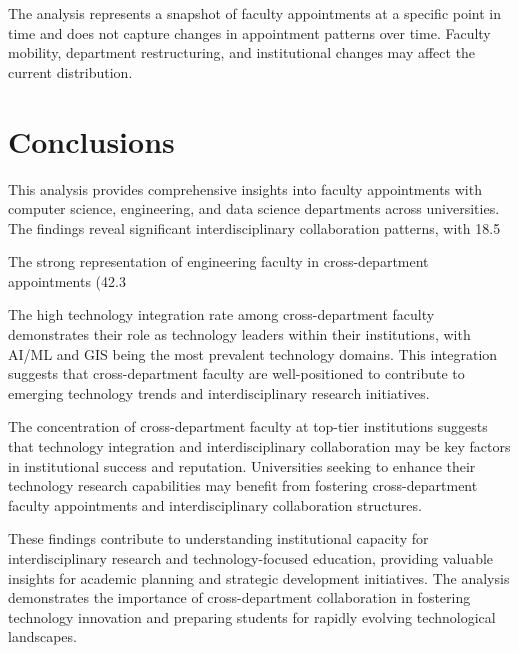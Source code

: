 \documentclass[12pt]{article}
\begin{document}
The analysis represents a snapshot of faculty appointments at a specific point in time and does not capture changes in appointment patterns over time. Faculty mobility, department restructuring, and institutional changes may affect the current distribution.

\section{Conclusions}

This analysis provides comprehensive insights into faculty appointments with computer science, engineering, and data science departments across universities. The findings reveal significant interdisciplinary collaboration patterns, with 18.5%

The strong representation of engineering faculty in cross-department appointments (42.3%

The high technology integration rate among cross-department faculty demonstrates their role as technology leaders within their institutions, with AI/ML and GIS being the most prevalent technology domains. This integration suggests that cross-department faculty are well-positioned to contribute to emerging technology trends and interdisciplinary research initiatives.

The concentration of cross-department faculty at top-tier institutions suggests that technology integration and interdisciplinary collaboration may be key factors in institutional success and reputation. Universities seeking to enhance their technology research capabilities may benefit from fostering cross-department faculty appointments and interdisciplinary collaboration structures.

These findings contribute to understanding institutional capacity for interdisciplinary research and technology-focused education, providing valuable insights for academic planning and strategic development initiatives. The analysis demonstrates the importance of cross-department collaboration in fostering technology innovation and preparing students for rapidly evolving technological landscapes.
\end{document}

